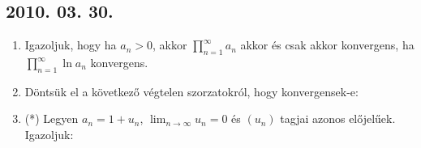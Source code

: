 \subsection*{2010. 03. 30.}
\begin{enumerate}
\item Igazoljuk, hogy ha $a_n>0$, akkor $\displaystyle\prod_{n=1}^{\infty} a_n$ akkor és csak akkor konvergens, ha $\displaystyle\prod_{n=1}^{\infty} \ln a_n$ konvergens.
\item Döntsük el a következő végtelen szorzatokról, hogy konvergensek-e:
\item (*) Legyen $a_n=1+u_n$, $\displaystyle\lim_{n \to \infty}u_n=0$ és $(u_n)$ tagjai azonos előjelűek. Igazoljuk:
\end{enumerate}

